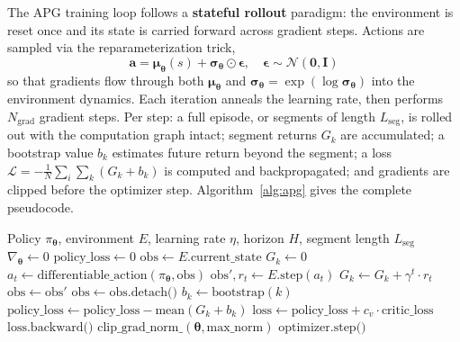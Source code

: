 \documentclass[11pt,a4paper]{article}
\newcommand{\cL}{\mathcal{L}}
\newcommand{\btheta}{\bm{\theta}}
\newcommand{\bepsilon}{\bm{\epsilon}}
\newcommand{\bmu}{\bm{\mu}}
\newcommand{\bsigma}{\bm{\sigma}}
\newcommand{\ba}{\mathbf{a}}
\begin{document}
The APG training loop follows a \textbf{stateful rollout} paradigm: the environment is reset once and its state is carried forward across gradient steps. Actions are sampled via the reparameterization trick,
\begin{equation}
  \ba = \bmu_{\btheta}(s) + \bsigma_{\btheta} \odot \bepsilon, \quad \bepsilon \sim \mathcal{N}(\mathbf{0}, \mathbf{I})
  \label{eq:reparam}
\end{equation}
so that gradients flow through both $\bmu_{\btheta}$ and $\bsigma_{\btheta} = \exp(\log\bsigma_{\btheta})$ into the environment dynamics. Each iteration anneals the learning rate, then performs $N_{\text{grad}}$ gradient steps. Per step: a full episode, or segments of length $L_{\mathrm{seg}}$, is rolled out with the computation graph intact; segment returns $G_k$ are accumulated; a bootstrap value $b_k$ estimates future return beyond the segment; a loss $\cL = -\frac{1}{N}\sum_{i}\sum_{k}(G_k + b_k)$ is computed and backpropagated; and gradients are clipped before the optimizer step. Algorithm~\ref{alg:apg} gives the complete pseudocode.

\begin{algorithm}[htbp]
  \caption{APG Training Iteration}
  \label{alg:apg}
  \begin{algorithmic}[1]
    \Require Policy $\pi_{\btheta}$, environment $E$, learning rate $\eta$, horizon $H$, segment length $L_{\mathrm{seg}}$
      \State $\nabla_{\btheta} \leftarrow 0$
      \State $\text{policy\_loss} \leftarrow 0$
      \State $\text{obs} \leftarrow E.\text{current\_state}$
        \State $G_k \leftarrow 0$
          \State $a_t \leftarrow \text{differentiable\_action}(\pi_{\btheta}, \text{obs})$ 
          \State $\text{obs}', r_t \leftarrow E.\text{step}(a_t)$ 
          \State $G_k \leftarrow G_k + \gamma^t \cdot r_t$
          \State $\text{obs} \leftarrow \text{obs}'$
        \EndFor
        \State $\text{obs} \leftarrow \text{obs}.\text{detach()}$ 
        \State $b_k \leftarrow \text{bootstrap}(k)$ 
        \State $\text{policy\_loss} \leftarrow \text{policy\_loss} - \text{mean}(G_k + b_k)$
      \EndFor
      \State $\text{loss} \leftarrow \text{policy\_loss} + c_v \cdot \text{critic\_loss}$ 
      \State $\text{loss}.\text{backward()}$
      \State $\text{clip\_grad\_norm}\_(\btheta, \text{max\_norm})$
      \State $\text{optimizer}.\text{step()}$
    \EndFor
  \end{algorithmic}
\end{algorithm}
\end{document}

